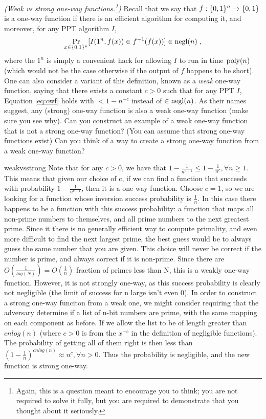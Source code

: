 \begin{questions}
{
\renewcommand*{\thefootnote}{$\clubsuit$}
  \question[3]
	\emph{(Weak vs strong one-way functions.\footnote{Again, this is a question meant to encourage you to think; you are not required to solve it fully, but you are required to demonstrate that you thought about it seriously.})} Recall that we say that $f: \{{0,1}\}^n \to \{{0,1}\}$ is a one-way function if there is an efficient algorithm for computing it, and moreover, for any PPT algorithm $I$,
	\begin{align}\label{eq:owf}
	\Pr_{x \in \{{0,1}\}^n} [ I(1^n, f(x)) \in f^{-1}(f(x)) ] \in \operatorname{negl}(n) \;,
	\end{align}
	where the $1^n$ is simply a convenient hack for allowing $I$ to run in time $\operatorname{poly}(n)$ (which would not be the case
	otherwise if the output of $f$ happens to be short). One can also consider a variant of this definition, known as a \emph{weak} one-way function, 
	saying that there exists a constant $c>0$ such that for any PPT $I$, Equation \eqref{eq:owf} holds with $ < 1-n^{-c}$ instead of
	$\in \operatorname{negl}(n)$. As their names suggest, any (strong) one-way function is also a weak one-way function (make sure you see why). 
	Can you construct an example of a weak one-way function that is not a strong one-way function? (You can assume that strong one-way functions exist)
	Can you think of a way to create a strong one-way function from a weak one-way function?
		\begin{mysolution}{weakvsstrong}
     Note that for any $c>0$, we have that $1-\frac{1}{n^{c-1}} \leq 1 - \frac{1}{n^{c}}, \forall n \geq1$. This means that given our choice of c, if we can find a function that succeeds with probability  $1-\frac{1}{n^{c-1}} $, then it is a one-way function. Choose $c=1$, so we are looking for a function whose inversion success probability is  $\frac{1}{n}$.  In this case there happens to be a function with this success probability: a function that maps all non-prime numbers to themselves, and all prime numbers to the next greatest prime. Since it there is no generally efficient way to compute primality, and even more difficult to find the next largest prime, the best guess would be to always guess the same number that you are given. This choice will never be correct if the number is prime, and always correct if it is non-prime. Since there are $O(\frac{1}{log(N)}) = O(\frac{1}{n})$ fraction of primes less than N, this is a weakly one-way function. However, it is not strongly one-way, as this success probability is clearly not negligible (the limit of success for n large isn't even 0). In order to construct a strong one-way funciton from a weak one, we might consider requiring that the adversary determine if a list of n-bit numbers are prime, with the same mapping on each component as before. If we allow the list to be of length greater than $c n log(n)$ (where $c>0$ is from the $x^{-c}$ in the definition of negligible functions). The probability of getting all of them right is then less than $(1-\frac{1}{n})^{c n log (n)} \approx n^c, \forall n>0$. Thus the probability is negligible, and the new function is strong one-way.
    \end{mysolution}
}



\end{questions}
